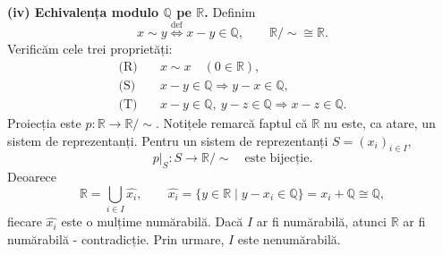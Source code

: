 \noindent\textbf{(iv) Echivalența modulo $\mathbb Q$ pe $\mathbb R$.}
Definim
\[
 x\sim y\overset{\mathrm{def}}\iff x-y\in\mathbb Q,
 \qquad \mathbb R/{\sim}\cong\mathbb R.
\]
Verificăm cele trei proprietăți:
\[
\begin{aligned}
\text{(R)}\quad &x\sim x\quad(0\in\mathbb R),\\
\text{(S)}\quad &x-y\in\mathbb Q\Longrightarrow y-x\in\mathbb Q,\\
\text{(T)}\quad &x-y\in\mathbb Q,\ y-z\in\mathbb Q
      \Longrightarrow x-z\in\mathbb Q.
\end{aligned}
\]
Proiecția este $p:\mathbb R\to\mathbb R/{\sim}$.
Notițele remarcă faptul că $\mathbb R$ nu este, ca atare,
un sistem de reprezentanți. Pentru un sistem de reprezentanți
$S=(x_i)_{i\in I}$,
\[
 p|_S:S\longrightarrow\mathbb R/{\sim}\quad\text{este bijecție}.
\]
Deoarece
\[
 \mathbb R=\bigcup_{i\in I}\widehat{x_i},\qquad
 \widehat{x_i}=\{y\in\mathbb R\mid y-x_i\in\mathbb Q\}
   =x_i+\mathbb Q\cong\mathbb Q,
\]
fiecare $\widehat{x_i}$ este o mulțime numărabilă. Dacă $I$ ar fi
numărabilă, atunci $\mathbb R$ ar fi numărabilă - contradicție.
Prin urmare, $I$ este nenumărabilă.

\endgroup
